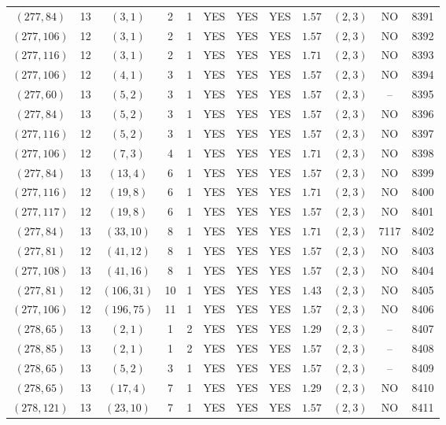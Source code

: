 \begin{longtable}{|c|c|c|c|c|c|c|c|c|c|c|c|}
$(277,84)$ & 13 & $(3,1)$ & 2 & 1 & YES & YES & YES & $1.57$ & $(2,3)$ & NO & 8391\\
$(277,106)$ & 12 & $(3,1)$ & 2 & 1 & YES & YES & YES & $1.57$ & $(2,3)$ & NO & 8392\\
$(277,116)$ & 12 & $(3,1)$ & 2 & 1 & YES & YES & YES & $1.71$ & $(2,3)$ & NO & 8393\\
$(277,106)$ & 12 & $(4,1)$ & 3 & 1 & YES & YES & YES & $1.57$ & $(2,3)$ & NO & 8394\\
$(277,60)$ & 13 & $(5,2)$ & 3 & 1 & YES & YES & YES & $1.57$ & $(2,3)$ & -- & 8395\\
$(277,84)$ & 13 & $(5,2)$ & 3 & 1 & YES & YES & YES & $1.57$ & $(2,3)$ & NO & 8396\\
$(277,116)$ & 12 & $(5,2)$ & 3 & 1 & YES & YES & YES & $1.57$ & $(2,3)$ & NO & 8397\\
$(277,106)$ & 12 & $(7,3)$ & 4 & 1 & YES & YES & YES & $1.71$ & $(2,3)$ & NO & 8398\\
$(277,84)$ & 13 & $(13,4)$ & 6 & 1 & YES & YES & YES & $1.57$ & $(2,3)$ & NO & 8399\\
$(277,116)$ & 12 & $(19,8)$ & 6 & 1 & YES & YES & YES & $1.71$ & $(2,3)$ & NO & 8400\\
$(277,117)$ & 12 & $(19,8)$ & 6 & 1 & YES & YES & YES & $1.57$ & $(2,3)$ & NO & 8401\\
$(277,84)$ & 13 & $(33,10)$ & 8 & 1 & YES & YES & YES & $1.71$ & $(2,3)$ & 7117 & 8402\\
$(277,81)$ & 12 & $(41,12)$ & 8 & 1 & YES & YES & YES & $1.57$ & $(2,3)$ & NO & 8403\\
$(277,108)$ & 13 & $(41,16)$ & 8 & 1 & YES & YES & YES & $1.57$ & $(2,3)$ & NO & 8404\\
$(277,81)$ & 12 & $(106,31)$ & 10 & 1 & YES & YES & YES & $1.43$ & $(2,3)$ & NO & 8405\\
$(277,106)$ & 12 & $(196,75)$ & 11 & 1 & YES & YES & YES & $1.57$ & $(2,3)$ & NO & 8406\\
$(278,65)$ & 13 & $(2,1)$ & 1 & 2 & YES & YES & YES & $1.29$ & $(2,3)$ & -- & 8407\\
$(278,85)$ & 13 & $(2,1)$ & 1 & 2 & YES & YES & YES & $1.57$ & $(2,3)$ & -- & 8408\\
$(278,65)$ & 13 & $(5,2)$ & 3 & 1 & YES & YES & YES & $1.57$ & $(2,3)$ & -- & 8409\\
$(278,65)$ & 13 & $(17,4)$ & 7 & 1 & YES & YES & YES & $1.29$ & $(2,3)$ & NO & 8410\\
$(278,121)$ & 13 & $(23,10)$ & 7 & 1 & YES & YES & YES & $1.57$ & $(2,3)$ & NO & 8411\\

\end{longtable}
